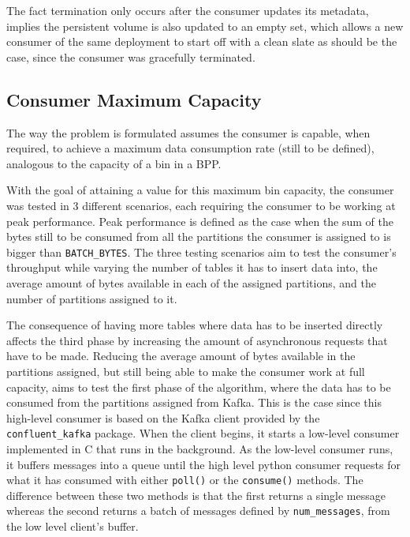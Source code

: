 The fact termination only occurs after the consumer updates its metadata,
implies the persistent volume is also updated to an empty set, which allows a
new consumer of the same deployment to start off with a clean slate as should be
the case, since the consumer was gracefully terminated.


\subsection{Consumer Maximum Capacity}
\label{c3subsub:consumer_maximum_capacity}

The way the problem is formulated assumes the consumer is capable, when
required, to achieve a maximum data consumption rate (still to be defined),
analogous to the capacity of a bin in a BPP.

With the goal of attaining a value for this maximum bin capacity, the consumer
was tested in 3 different scenarios, each requiring the consumer to be working
at peak performance.  Peak performance is defined as the case when the sum of
the bytes still to be consumed from all the partitions the consumer is assigned
to is bigger than \lstinline{BATCH_BYTES}. The three testing scenarios aim to
test the consumer's throughput while varying the number of tables it has to
insert data into, the average amount of bytes available in each of the assigned
partitions, and the number of partitions assigned to it.

The consequence of having more tables where data has to be inserted directly
affects the third phase by increasing the amount of asynchronous requests that
have to be made. Reducing the average amount of bytes available in the
partitions assigned, but still being able to make the consumer work at full
capacity, aims to test the first phase of the algorithm, where the data has to
be consumed from the partitions assigned from Kafka.  This is the case since
this high-level consumer is based on the Kafka client provided by the
\lstinline{confluent_kafka} package.  When the client begins, it starts a
low-level consumer implemented in C that runs in the background. As the
low-level consumer runs, it buffers messages into a queue until the high level
python consumer requests for what it has consumed with either \lstinline{poll()}
or the \lstinline{consume()} methods. The difference between these two methods
is that the first returns a single message whereas the second returns a batch of
messages defined by \lstinline{num_messages}, from the low level client's
buffer. 

